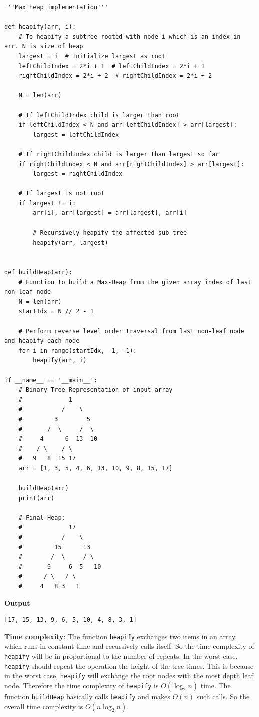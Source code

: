 \documentclass[a4paper,11pt]{book}
\begin{document}
\begin{lstlisting}
'''Max heap implementation'''

def heapify(arr, i):
    # To heapify a subtree rooted with node i which is an index in arr. N is size of heap
    largest = i  # Initialize largest as root
    leftChildIndex = 2*i + 1  # leftChildIndex = 2*i + 1
    rightChildIndex = 2*i + 2  # rightChildIndex = 2*i + 2

    N = len(arr)
 
    # If leftChildIndex child is larger than root
    if leftChildIndex < N and arr[leftChildIndex] > arr[largest]:
        largest = leftChildIndex
 
    # If rightChildIndex child is larger than largest so far
    if rightChildIndex < N and arr[rightChildIndex] > arr[largest]:
        largest = rightChildIndex
 
    # If largest is not root
    if largest != i:
        arr[i], arr[largest] = arr[largest], arr[i]
 
        # Recursively heapify the affected sub-tree
        heapify(arr, largest)
 

def buildHeap(arr):
    # Function to build a Max-Heap from the given array index of last non-leaf node
    N = len(arr)
    startIdx = N // 2 - 1
 
    # Perform reverse level order traversal from last non-leaf node and heapify each node
    for i in range(startIdx, -1, -1):
        heapify(arr, i)
 
if __name__ == '__main__':
    # Binary Tree Representation of input array
    #             1
    #           /    \
    #         3        5
    #       /  \     /  \
    #     4      6  13  10
    #    / \    / \
    #   9   8  15 17
    arr = [1, 3, 5, 4, 6, 13, 10, 9, 8, 15, 17]
 
    buildHeap(arr)
    print(arr)

    # Final Heap:
    #             17
    #           /    \
    #         15      13
    #        /  \     / \
    #       9     6  5   10
    #      / \   / \
    #     4   8 3   1
\end{lstlisting}
\textbf{Output}
\begin{lstlisting}
[17, 15, 13, 9, 6, 5, 10, 4, 8, 3, 1]
\end{lstlisting}

\noindent \textbf{Time complexity}: The function \lstinline{heapify} exchanges two items in an array, which runs in constant time and recursively calls itself. So the time complexity of \lstinline{heapify} will be in proportional to the number of repeats. In the worst case, \lstinline{heapify} should repeat the operation the height of the tree times. This is because in the worst case, \lstinline{heapify} will exchange the root nodes with the most depth leaf node. Therefore the time complexity of \lstinline{heapify} is $O(\log_2 n)$ time. The function \lstinline{buildHeap} basically calls \lstinline{heapify} and makes $O(n)$ such calls. So the overall time complexity is $O(n\log_2 n)$.
\end{document}
